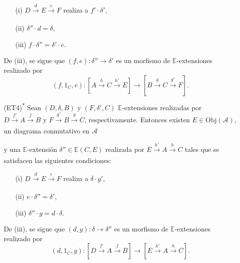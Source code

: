 \documentclass[tesis]{subfiles}
\begin{document}
\begin{Def}
\begin{itemize}
\begin{itemize}
                \item[(i)] $D\xrightarrow[]{d}E\xrightarrow[]{e}F$ realiza a $f'\cdot\delta'$,

                \item[(ii)] $\delta''\cdot d = \delta$,

                \item[(iii)] $f\cdot\delta'' = \delta'\cdot e$. 
            \end{itemize}
            De (iii), se sigue que $(f,e):\delta''\to \delta'$ es un morfismo de $\mathbb{E}$-extensiones realizado por
                    \[
                        (f,1_{C},e): [A\xrightarrow[]{h}C\xrightarrow[]{h'}E] \to [B\xrightarrow[]{g}C\xrightarrow[]{g'}F].
                    \] 

                \item[(ET4)\textsuperscript{$\ast$}] Sean $(D,\delta,B)$ y $(F,\delta',C)$ $\mathbb{E}$-extensiones realizadas por $D\xrightarrow[]{f'} A\xrightarrow[]{f} B$ y $F\xrightarrow[]{g'} B\xrightarrow[]{g} C$, respectivamente. Entonces existen $E\in\text{Obj}(\mathscr{A})$, un diagrama conmutativo en $\mathscr{A}$
            \begin{center}
            \end{center}
            y una $\mathbb{E}$-extensión $\delta''\in\mathbb{E}(C,E)$ realizada por $E\xrightarrow[]{h'}A\xrightarrow[]{h}C$ tales que se satisfacen las siguientes condiciones:
            \begin{itemize}
            
                \item[(i)] $D\xrightarrow[]{d}E\xrightarrow[]{e}F$ realiza a $\delta\cdot g'$,

                \item[(ii)] $e\cdot\delta'' = \delta'$,

                \item[(iii)] $\delta''\cdot g = d\cdot\delta$. 
            \end{itemize}
            De (iii), se sigue que $(d,g):\delta\to \delta''$ es un morfismo de $\mathbb{E}$-extensiones realizado por
                    \[
                        (d,1_{C},g): [D\xrightarrow[]{f'}A\xrightarrow[]{f}B] \to [E\xrightarrow[]{h'}A\xrightarrow[]{h}C].
                    \] 
    \end{itemize}


\end{Def}
\end{document}
